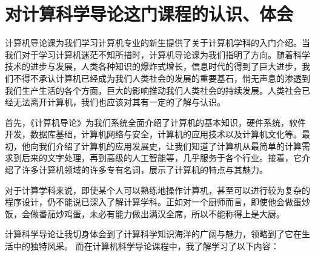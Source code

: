 \documentclass{article}
\begin{document}
\section{对计算科学导论这门课程的认识、体会}
计算机导论课为我们学习计算机专业的新生提供了关于计算机学科的入门介绍。当我们对于学习计算机迷茫不知所措时，计算机导论课为我们指明了方向。随着科学技术的进步与发展，人类各种知识的爆炸式增长，信息时代的得到了巨大进步，我们不得不承认计算机已经成为我们人类社会的发展的重要基石，悄无声息的渗透到我们生产生活的各个方面，巨大的影响推动我们人类社会的持续发展。人类社会已经无法离开计算机，我们也应该对其有一定的了解与认识。\par
首先，《计算机导论》为我们系统全面介绍了计算机的基本知识，硬件系统，软件开发，数据库基础，计算机网络与安全，计算机的应用技术以及计算机文化等。最初，他向我们介绍了计算机的应用发展史，让我们知道了计算机从最简单的计算需求到后来的文字处理，再到高级的人工智能等，几乎服务于各个行业。接着，它介绍了许多计算机领域的许多专有名词，展示了计算机的特点与其魅力。\par
对于计算学科来说，即使某个人可以熟练地操作计算机，甚至可以进行较为复杂的程序设计，仍不能说已深入了解计算学科。正如对一个厨师而言，即使他会做蛋炒饭，会做番茄炒鸡蛋，未必有能力做出满汉全席，所以不能称得上是大厨。\par
计算科学导论让我切身体会到了计算科学知识海洋的广阔与魅力，领略到了它在生活中的独特风采。 而在计算机科学导论课程中，我了解学习了以下内容：\par
\end{document}
